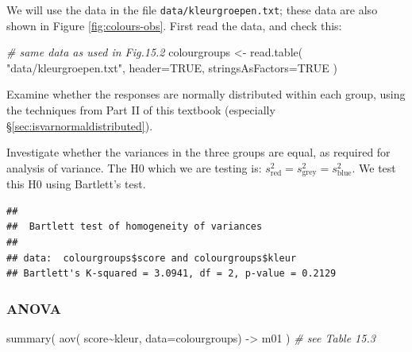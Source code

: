 \documentclass[
]{book}
\newenvironment{Shaded}{\begin{snugshade}}{\end{snugshade}}
\newcommand{\AttributeTok}[1]{\textcolor[rgb]{0.77,0.63,0.00}{#1}}
\newcommand{\CommentTok}[1]{\textcolor[rgb]{0.56,0.35,0.01}{\textit{#1}}}
\newcommand{\ConstantTok}[1]{\textcolor[rgb]{0.00,0.00,0.00}{#1}}
\newcommand{\FunctionTok}[1]{\textcolor[rgb]{0.00,0.00,0.00}{#1}}
\newcommand{\NormalTok}[1]{#1}
\newcommand{\OtherTok}[1]{\textcolor[rgb]{0.56,0.35,0.01}{#1}}
\newcommand{\SpecialCharTok}[1]{\textcolor[rgb]{0.00,0.00,0.00}{#1}}
\newcommand{\StringTok}[1]{\textcolor[rgb]{0.31,0.60,0.02}{#1}}
\begin{document}
We will use the data in the file \texttt{data/kleurgroepen.txt}; these data are also shown in Figure \ref{fig:colours-obs}. First read the data, and check this:

\begin{Shaded}
\begin{Highlighting}[]
\CommentTok{\# same data as used in Fig.15.2}
\NormalTok{colourgroups }\OtherTok{\textless{}{-}} \FunctionTok{read.table}\NormalTok{( }\StringTok{"data/kleurgroepen.txt"}\NormalTok{, }
                            \AttributeTok{header=}\ConstantTok{TRUE}\NormalTok{, }\AttributeTok{stringsAsFactors=}\ConstantTok{TRUE}\NormalTok{ )}
\end{Highlighting}
\end{Shaded}

Examine whether the responses are normally distributed within each group, using
the techniques from Part II of this textbook (especially
§\ref{sec:isvarnormaldistributed}).

Investigate whether the variances in the three groups are equal, as required
for analysis of variance. The H0 which we are testing is:
\(s^2_\textrm{red} = s^2_\textrm{grey} = s^2_\textrm{blue}\). We
test this H0 using Bartlett's test.

\begin{Shaded}
\end{Shaded}

\begin{verbatim}
## 
##  Bartlett test of homogeneity of variances
## 
## data:  colourgroups$score and colourgroups$kleur
## Bartlett's K-squared = 3.0941, df = 2, p-value = 0.2129
\end{verbatim}

\hypertarget{anova-2}{%
\subsubsection{ANOVA}\label{anova-2}}

\begin{Shaded}
\begin{Highlighting}[]
\FunctionTok{summary}\NormalTok{( }\FunctionTok{aov}\NormalTok{( score}\SpecialCharTok{\textasciitilde{}}\NormalTok{kleur, }\AttributeTok{data=}\NormalTok{colourgroups) }\OtherTok{{-}\textgreater{}}\NormalTok{ m01 ) }\CommentTok{\# see Table 15.3}
\end{Highlighting}
\end{Shaded}
\end{document}
